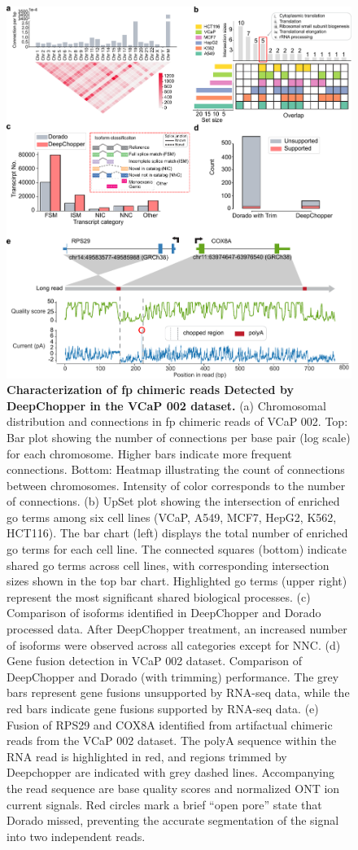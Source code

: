 \documentclass[pdflatex,sn-nature, lineno]{sn-jnl}%
\theoremstyle{thmstyleone}%
\theoremstyle{thmstyletwo}%
\theoremstyle{thmstylethree}%
\begin{document}
\begin{figure}[H]
	\includegraphics[height=1\columnwidth]{finals/figure2}
	\caption{{\bf Characterization of \gls{fp} chimeric reads Detected by DeepChopper in the VCaP 002 dataset.} (a) Chromosomal distribution and connections in \gls{fp} chimeric reads of VCaP 002. Top: Bar plot showing the number of connections per base pair (log scale) for each chromosome. Higher bars indicate more frequent connections. Bottom: Heatmap illustrating the count of connections between chromosomes. Intensity of color corresponds to the number of connections. (b) UpSet plot showing the intersection of enriched \gls{go} terms among six cell lines (VCaP, A549, MCF7, HepG2, K562, HCT116). The bar chart (left) displays the total number of enriched \gls{go} terms for each cell line. The connected squares (bottom) indicate shared \gls{go} terms across cell lines, with corresponding intersection sizes shown in the top bar chart. Highlighted \gls{go} terms (upper right) represent the most significant shared biological processes. (c) Comparison of isoforms identified in DeepChopper and Dorado processed data. After DeepChopper treatment, an increased number of isoforms were observed across all categories except for NNC. (d) Gene fusion detection in VCaP 002 dataset. Comparison of DeepChopper and Dorado (with trimming) performance. The grey bars represent gene fusions unsupported by RNA-seq data, while the red bars indicate gene fusions supported by RNA-seq data. (e) Fusion of RPS29 and COX8A identified from artifactual chimeric reads from the VCaP 002 dataset. The polyA sequence within the RNA read is highlighted in red, and regions trimmed by Deepchopper are indicated with grey dashed lines. Accompanying the read sequence are base quality scores and normalized ONT ion current signals. Red circles mark a brief ``open pore'' state that Dorado missed, preventing the accurate segmentation of the signal into two independent reads.}\label{fig:f2}
\end{figure}
\end{document}

